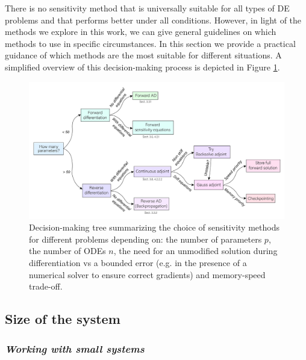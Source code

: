 

There is no sensitivity method that is universally suitable for all types of DE problems and that performs better under all conditions. 
However, in light of the methods we explore in this work, we can give general guidelines on which methods to use in specific circumstances.
In this section we provide a practical guidance of which methods are the most suitable for different situations. 
A simplified overview of this decision-making process is depicted in Figure \ref{fig:roadmap}. 

\begin{figure}[tb]
    \centering
    \includegraphics[width=1\textwidth]{figures/roadmap.pdf}
    \caption{Decision-making tree summarizing the choice of sensitivity methods for different problems depending on: the number of parameters $p$, the number of ODEs $n$, the need for an unmodified solution during differentiation vs a bounded error (e.g. in the presence of a numerical solver to ensure correct gradients) and memory-speed trade-off.}
    \label{fig:roadmap}
\end{figure}

\subsection*{Size of the system}

\subsubsection*{\textit{Working with small systems}}

